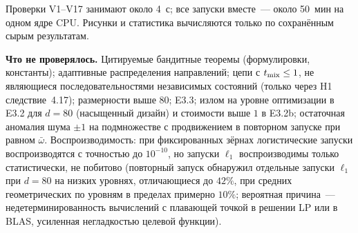 \documentclass[11pt,a4paper]{article}
\numberwithin{equation}{section}
\theoremstyle{definition}
\theoremstyle{remark}
\newcommand{\wbar}{\bar\omega}\newcommand{\Atwo}{\cA^{\rm 2pt}_\gamma}
\begin{document}
Проверки V1--V17 занимают около 4~с; все запуски вместе~--- около 50~мин на одном ядре CPU. Рисунки и статистика вычисляются только по сохранённым сырым результатам.

\textbf{Что не проверялось.} Цитируемые бандитные теоремы (формулировки, константы); адаптивные распределения направлений; цепи с $t_{\rm mix}\le1$, не являющиеся последовательностями независимых состояний (только через H1 следствие~4.17); размерности выше $80$; E3.3; излом на уровне оптимизации в E3.2 для $d=80$ (насыщенный дизайн) и стоимости выше $1$ в E3.2b; остаточная аномалия шума $\pm1$ на подмножестве с продвижением в повторном запуске при равном $\wbar$. Воспроизводимость: при фиксированных зёрнах логистические запуски воспроизводятся с точностью до $10^{-10}$, но запуски $\ell_1$ воспроизводимы только статистически, не побитово (повторный запуск обнаружил отдельные запуски $\ell_1$ при $d=80$ на низких уровнях, отличающиеся до $42\%$, при средних геометрических по уровням в пределах примерно $10\%$; вероятная причина~--- недетерминированность вычислений с плавающей точкой в решении LP или в BLAS, усиленная негладкостью целевой функции).
\end{document}
